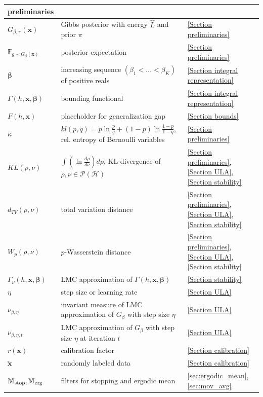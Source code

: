 \documentclass{article} %
\begin{document}
\begin{tabular}{l|l|l}
{preliminaries} \\ \hline
$G_{\beta ,\pi }\left( \mathbf{x}\right) $ & Gibbs posterior with energy $%
\hat{L}$ and prior $\pi $ & \ref{Section preliminaries} \\ \hline
$\mathbb{E}_{g\sim G_{\beta }\left( \mathbf{x}\right) }$ & posterior
expectation & \ref{Section preliminaries} \\ \hline
$\bm{\beta }$ & increasing sequence $\left( \beta _{1}<...<\beta
_{K}\right) $ of positive reals & \ref{Section integral representation} \\ 
\hline
$\Gamma \left( h,\mathbf{x},\bm{\beta}\right) $ & bounding functional & \ref{Section
integral representation} \\ \hline
$F\left( h,\mathbf{x}\right) $ & placeholder for generalization gap & \ref{Section bounds} \\ 
\hline
$\kappa $ & $kl\left( p,q\right) =p\ln \frac{p}{q}+\left( 1-p\right) \ln 
\frac{1-p}{1-q}$, rel. entropy of Bernoulli variables & \ref{Section
preliminaries} \\ \hline
$KL\left( \rho ,\nu \right) $ & $\int \left( \ln \frac{d\rho }{d\nu }\right)
d\rho $, KL-divergence of $\rho ,\nu \in \mathcal{P}\left( \mathcal{H}%
\right) $ & \ref{Section
preliminaries}, \ref{Section ULA},  \ref{Section stability} \\ \hline
$d_{TV}\left( \rho ,\nu \right) $ & total variation distance & \ref{Section
preliminaries}, \ref{Section ULA},  \ref{Section stability} \\ \hline
$W_{p}\left( \rho ,\nu \right) $ & $p$-Wasserstein distance & \ref{Section
preliminaries}, \ref{Section ULA},  \ref{Section stability} \\ \hline
$\Gamma _{\nu }\left( h,\mathbf{x},\bm{\beta}\right) $ & LMC
approximation of $\Gamma \left( h,\mathbf{x},\bm{\beta}\right) $ &  \ref{Section stability}\\ 
\hline
$\eta$ & step size or learning rate & \ref{Section ULA} \\ \hline
$\nu _{\beta ,\eta }$ & invariant measure of LMC approximation of $G_{\beta }
$ with step size $\eta $ & \ref{Section ULA} \\ \hline
$\nu _{\beta ,\eta ,t}$ & LMC approximation of $G_{\beta }$ with step size $%
\eta $ at iteration $t$ & \ref{Section ULA} \\ \hline
$r({\mathbf x})$ & calibration factor & \ref{Section calibration} \\ \hline
$\mathbf{\tilde{x}}$ & randomly labeled  data & \ref{Section calibration} \\ \hline
$\mathbb{M}_{\rm stop}$,$\mathbb{M}_{\rm erg}$ & filters for stopping and ergodic mean & \ref{sec:ergodic_mean}, \ref{sec:mov_avg} \\ \hline
\end{tabular}%
\end{document}
